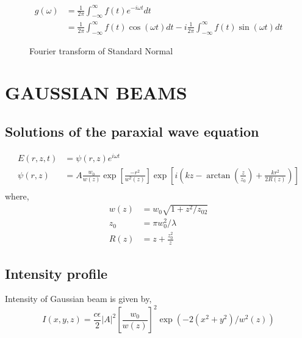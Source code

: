 \documentclass[11pt,a4paper]{article}
\begin{document}
\begin{align*}
	g(\omega)&=\frac{1}{2\pi}\int_{-\infty}^{\infty}f(t)e^{-i\omega t} dt\\
	&=\frac{1}{2\pi}\int_{-\infty}^{\infty}f(t)\cos(\omega t) dt - i \frac{1}{2\pi}\int_{-\infty}^{\infty}f(t)\sin(\omega t) dt
\end{align*}





\begin{figure}[ht]
	\centering
	\scalebox{1}{}
	\caption{Fourier transform of Standard Normal}
	\label{fig:fft_gaussian}
\end{figure}
\clearpage

\section{GAUSSIAN BEAMS}
\subsection{Solutions of the paraxial wave equation}
\vspace{-0.5cm}
\begin{align*}
	E(r,z,t)&=\psi(r,z)e^{i\omega t}\\
	\psi(r,z)&=A\frac{w_0}{w(z)}\exp{\left[\frac{-r^2}{w^2(z)}\right]} \exp{\left[i\left(kz-\arctan(\frac{z}{z_0})+\frac{kr^2}{2R(z)}\right)\right]}\\
\end{align*}
where,
\begin{align*}
	w(z)&= w_0\sqrt{1+z^2/z_02}\\
	z_0&=\pi w_0^2/\lambda\\
	R(z)&=z+\frac{z_0^2}{z}
\end{align*}

\subsection{Intensity profile}
Intensity of Gaussian beam is given by,
$$I(x,y,z)=\frac{c\epsilon}{2} |A|^2 \left[\frac{w_0}{w(z)}\right]^2\exp{\left(-2(x^2+y^2)/w^2(z)\right)}$$ 



\end{document}
